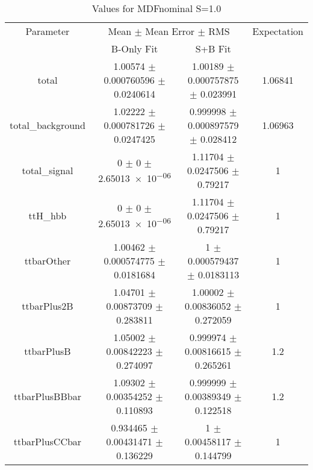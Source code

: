 \begin{table}
\centering
\caption{Values for MDFnominal S=1.0}
\begin{tabular}{cccc}
\toprule
Parameter & \multicolumn{2}{c}{Mean $\pm$ Mean Error $\pm$ RMS} & Expectation\\
 & B-Only Fit & S+B Fit & \\
\midrule
total & \num{1.00574} $\pm$ \num{0.000760596} $\pm$ \num{0.0240614} & \num{1.00189} $\pm$ \num{0.000757875} $\pm$ \num{0.023991} & \num{1.06841}\\
total\_background & \num{1.02222} $\pm$ \num{0.000781726} $\pm$ \num{0.0247425} & \num{0.999998} $\pm$ \num{0.000897579} $\pm$ \num{0.028412} & \num{1.06963}\\
total\_signal & \num{0} $\pm$ \num{0} $\pm$ \num{2.65013e-06} & \num{1.11704} $\pm$ \num{0.0247506} $\pm$ \num{0.79217} & \num{1}\\
ttH\_hbb & \num{0} $\pm$ \num{0} $\pm$ \num{2.65013e-06} & \num{1.11704} $\pm$ \num{0.0247506} $\pm$ \num{0.79217} & \num{1}\\
ttbarOther & \num{1.00462} $\pm$ \num{0.000574775} $\pm$ \num{0.0181684} & \num{1} $\pm$ \num{0.000579437} $\pm$ \num{0.0183113} & \num{1}\\
ttbarPlus2B & \num{1.04701} $\pm$ \num{0.00873709} $\pm$ \num{0.283811} & \num{1.00002} $\pm$ \num{0.00836052} $\pm$ \num{0.272059} & \num{1}\\
ttbarPlusB & \num{1.05002} $\pm$ \num{0.00842223} $\pm$ \num{0.274097} & \num{0.999974} $\pm$ \num{0.00816615} $\pm$ \num{0.265261} & \num{1.2}\\
ttbarPlusBBbar & \num{1.09302} $\pm$ \num{0.00354252} $\pm$ \num{0.110893} & \num{0.999999} $\pm$ \num{0.00389349} $\pm$ \num{0.122518} & \num{1.2}\\
ttbarPlusCCbar & \num{0.934465} $\pm$ \num{0.00431471} $\pm$ \num{0.136229} & \num{1} $\pm$ \num{0.00458117} $\pm$ \num{0.144799} & \num{1}\\
\bottomrule
\end{tabular}
\end{table}